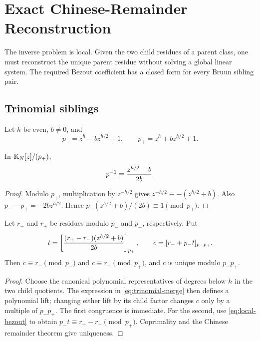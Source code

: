 \section{Exact Chinese-Remainder Reconstruction}
\label{sec:crt}

The inverse problem is local.  Given the two child residues of a parent class,
one must reconstruct the unique parent residue without solving a global linear
system.  The required Bezout coefficient has a closed form for every Bruun
sibling pair.

\subsection{Trinomial siblings}

Let $h$ be even, $b\ne0$, and
\begin{equation}
 p_-=z^h-bz^{h/2}+1,
 \qquad
 p_+=z^h+bz^{h/2}+1.
 \label{eq:crt-siblings}
\end{equation}

\begin{lemma}
In $\mathbb{K}_N[z]/(p_+)$,
\begin{equation}
 p_-^{-1}\equiv {z^{h/2}+b\over 2b}.
 \label{eq:local-bezout}
\end{equation}
\end{lemma}
\begin{proof}
Modulo $p_+$, multiplication by $z^{-h/2}$ gives
$z^{-h/2}\equiv-(z^{h/2}+b)$.  Also
$p_--p_+=-2bz^{h/2}$.  Hence
$p_-(z^{h/2}+b)/(2b)\equiv1\pmod{p_+}$.
\end{proof}

\begin{proposition}
Let $r_-$ and $r_+$ be residues modulo $p_-$ and $p_+$, respectively.  Put
\begin{equation}
 t=\left[
 { (r_+-r_-)(z^{h/2}+b)\over 2b}
 \right]_{p_+},
 \qquad
 c=[r_-+p_-t]_{p_-p_+}.
 \label{eq:trinomial-merge}
\end{equation}
Then $c\equiv r_-\pmod{p_-}$ and $c\equiv r_+\pmod{p_+}$, and $c$ is unique
modulo $p_-p_+$.
\end{proposition}
\begin{proof}
Choose the canonical polynomial representatives of degrees below $h$ in the
two child quotients.  The expression in \eqref{eq:trinomial-merge} then defines
a polynomial lift; changing either lift by its child factor changes $c$ only by
a multiple of $p_-p_+$.
The first congruence is immediate.  For the second, use
\eqref{eq:local-bezout} to obtain
$p_-t\equiv r_+-r_-\pmod{p_+}$.  Coprimality and the Chinese remainder theorem
give uniqueness.
\end{proof}

